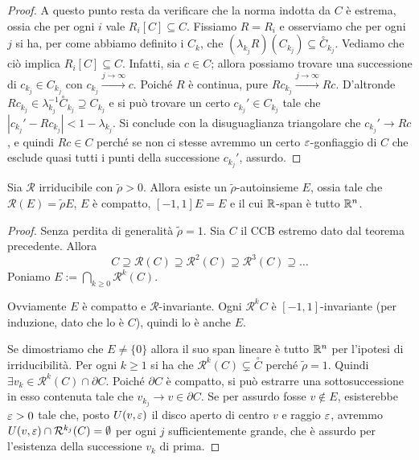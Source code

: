 \begin{proof}
	A questo punto resta da verificare che la norma indotta da $C$ è estrema, ossia che per ogni $i$ vale $R_{i}[C]\subseteq C$. Fissiamo $R = R_{i}$ e osserviamo che per ogni $j$ si ha, per come abbiamo definito i $C_{k}$, che $(\lambda_{k_{j}}R)(C_{k_{j}})\subseteq\overset{\circ}C_{k_{j}}$.
	Vediamo che ciò implica $R_{i}[C]\subseteq C$.
	Infatti, sia $c\in C$; allora possiamo trovare una successione di $c_{k_{j}}\in C_{k_{j}}$ con $c_{k_{j}}\xrightarrow[]{j\to\infty}c$.
	Poiché $R$ è continua, pure $Rc_{k_{j}}\xrightarrow[]{j\to\infty}Rc$.
	D'altronde $Rc_{k_{j}}\in\lambda_{k_{j}}^{-1}\overset{\circ}C_{k_{j}}\supseteq C_{k_{j}}$ e si può trovare un certo $c_{k_{j}}'\in C_{k_{j}}$ tale che $|c_{k_{j}}' - Rc_{k_{j}}|<1-\lambda_{k_{j}}$.
	Si conclude con la disuguaglianza triangolare che $c_{k_{j}}'\to Rc$, e quindi $Rc\in C$ perché se non ci stesse avremmo un certo $\varepsilon$-gonfiaggio di $C$ che esclude quasi tutti i punti della successione $c_{k_{j}}'$, assurdo. 
\end{proof}

\begin{teorema}
	Sia $\mathcal R$ irriducibile con $\tilde\rho>0$. Allora esiste un $\tilde\rho$-autoinsieme $E$, ossia tale che $\mathcal R(E) = \tilde\rho E$, $E$ è compatto, $[-1,1]E = E$ e il cui $\mathbb{R}$-span è tutto $\mathbb{R}^{n}$.
\end{teorema}
\begin{proof}
	Senza perdita di generalità $\tilde\rho = 1$. Sia $C$ il CCB estremo dato dal teorema precedente. Allora
	$$C\supseteq \mathcal R(C) \supseteq\mathcal R^{2}(C)\supseteq \mathcal R^{3}(C)\supseteq\dots$$
	Poniamo $E:= \bigcap_{k\geq0}\mathcal R^{k}(C)$.
	
	Ovviamente $E$ è compatto e $\mathcal R$-invariante. Ogni $\mathcal R^{k}C$ è $[-1,1]$-invariante (per induzione, dato che lo è $C$), quindi lo è anche $E$. 
	
	Se dimostriamo che $E\neq\{0\}$ allora il suo span lineare è tutto $\mathbb{R}^{n}$ per l'ipotesi di irriducibilità. 
	Per ogni $k\geq1$ si ha che $\mathcal R^{k}(C)\subsetneq\overset{\circ}C$ perché $\tilde\rho = 1$. Quindi $\exists v_{k}\in \mathcal R^{k}(C)\cap \partial C$.
	Poiché $\partial C$ è compatto, si può estrarre una sottosuccessione in esso contenuta tale che $v_{k_{j}}\to v\in\partial C$.
	Se per assurdo fosse $v\not\in E$, esisterebbe $\varepsilon>0$ tale che, posto $U(v,\varepsilon)$ il disco aperto di centro $v$ e raggio $\varepsilon$, avremmo $U(v,\varepsilon)\cap\mathcal R^{k_{j}}(C) = \emptyset$ per ogni $j$ sufficientemente grande, che è assurdo per l'esistenza della successione $v_{k}$ di prima.
\end{proof}


